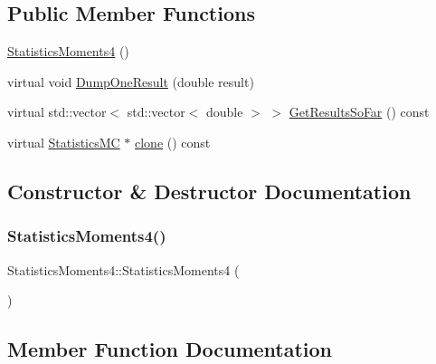 \subsection*{Public Member Functions}
\begin{DoxyCompactItemize}
\item 
\hyperlink{classStatisticsMoments4_a70096f38c2c2a6f15c3ab1d3e4500101}{Statistics\+Moments4} ()
\item 
virtual void \hyperlink{classStatisticsMoments4_aa68d32f4eda0c2be64ef35ebac9bbe0b}{Dump\+One\+Result} (double result)
\item 
virtual std\+::vector$<$ std\+::vector$<$ double $>$ $>$ \hyperlink{classStatisticsMoments4_a46b2f0c0688de83ea348a51ea7f6eaf1}{Get\+Results\+So\+Far} () const
\item 
virtual \hyperlink{classStatisticsMC}{Statistics\+MC} $\ast$ \hyperlink{classStatisticsMoments4_a7196986cea84e8d9589ac51d50eaba15}{clone} () const
\end{DoxyCompactItemize}


\subsection{Constructor \& Destructor Documentation}
\hypertarget{classStatisticsMoments4_a70096f38c2c2a6f15c3ab1d3e4500101}{}\label{classStatisticsMoments4_a70096f38c2c2a6f15c3ab1d3e4500101} 
\subsubsection{\texorpdfstring{Statistics\+Moments4()}{StatisticsMoments4()}}
{\footnotesize\ttfamily Statistics\+Moments4\+::\+Statistics\+Moments4 (\begin{DoxyParamCaption}{ }\end{DoxyParamCaption})}



\subsection{Member Function Documentation}
\hypertarget{classStatisticsMoments4_a7196986cea84e8d9589ac51d50eaba15}{}\label{classStatisticsMoments4_a7196986cea84e8d9589ac51d50eaba15} 
